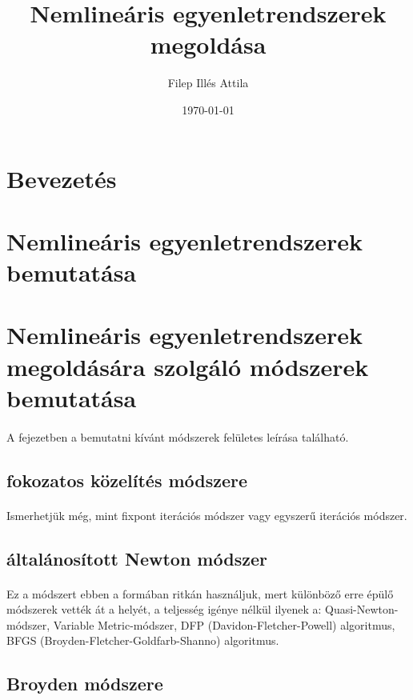 \documentclass[11pt,twoside,a4pape,draftr]{article}
\title{Nemlineáris egyenletrendszerek megoldása}
\date{\today}
\author{Filep Illés Attila}
\begin{document}
 	\maketitle
  	\newpage

	\begin{abstract}

	\end{abstract}
	\tableofcontents
	\section*{Bevezetés}
	\section{Nemlineáris egyenletrendszerek bemutatása}
	\section{Nemlineáris egyenletrendszerek megoldására szolgáló módszerek bemutatása}
		\paragraph{}
			A fejezetben a bemutatni kívánt módszerek felületes leírása található.
		\subsection{fokozatos közelítés módszere}
			\paragraph{}
				Ismerhetjük még, mint fixpont iterációs módszer vagy egyszerű iterációs módszer.
		\subsection{általánosított Newton módszer}
			\paragraph{}
				Ez a módszert ebben a formában ritkán használjuk, mert különböző erre épülő módszerek vették át a helyét, a teljesség igénye nélkül ilyenek a: Quasi-Newton-módszer,  Variable Metric-módszer,  DFP (Davidon-Fletcher-Powell) algoritmus, 	BFGS (Broyden-Fletcher-Goldfarb-Shanno) algoritmus.
		\subsection{Broyden módszere}
\end{document}
